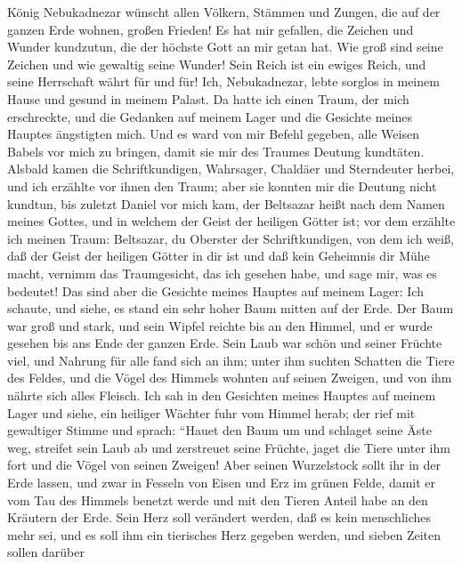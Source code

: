  König Nebukadnezar wünscht allen Völkern, Stämmen und
Zungen, die auf der ganzen Erde wohnen, großen Frieden! 
Es hat mir gefallen, die Zeichen und Wunder kundzutun, die der höchste
Gott an mir getan hat.  Wie groß sind seine Zeichen und
wie gewaltig seine Wunder! Sein Reich ist ein ewiges Reich, und seine
Herrschaft währt für und für!  Ich, Nebukadnezar, lebte
sorglos in meinem Hause und gesund in meinem Palast.  Da
hatte ich einen Traum, der mich erschreckte, und die Gedanken auf meinem
Lager und die Gesichte meines Hauptes ängstigten mich. 
Und es ward von mir Befehl gegeben, alle Weisen Babels vor mich zu
bringen, damit sie mir des Traumes Deutung kundtäten. 
Alsbald kamen die Schriftkundigen, Wahrsager, Chaldäer und Sterndeuter
herbei, und ich erzählte vor ihnen den Traum; aber sie konnten mir die
Deutung nicht kundtun,  bis zuletzt Daniel vor mich kam,
der Beltsazar heißt nach dem Namen meines Gottes, und in welchem der
Geist der heiligen Götter ist; vor dem erzählte ich meinen Traum:
 Beltsazar, du Oberster der Schriftkundigen, von dem ich
weiß, daß der Geist der heiligen Götter in dir ist und daß kein
Geheimnis dir Mühe macht, vernimm das Traumgesicht, das ich gesehen
habe, und sage mir, was es bedeutet!  Das sind aber die
Gesichte meines Hauptes auf meinem Lager: Ich schaute, und siehe, es
stand ein sehr hoher Baum mitten auf der Erde.  Der Baum
war groß und stark, und sein Wipfel reichte bis an den Himmel, und er
wurde gesehen bis ans Ende der ganzen Erde.  Sein Laub
war schön und seiner Früchte viel, und Nahrung für alle fand sich an
ihm; unter ihm suchten Schatten die Tiere des Feldes, und die Vögel des
Himmels wohnten auf seinen Zweigen, und von ihm nährte sich alles
Fleisch.  Ich sah in den Gesichten meines Hauptes auf
meinem Lager und siehe, ein heiliger Wächter fuhr vom Himmel herab;
 der rief mit gewaltiger Stimme und sprach: ``Hauet den
Baum um und schlaget seine Äste weg, streifet sein Laub ab und
zerstreuet seine Früchte, jaget die Tiere unter ihm fort und die Vögel
von seinen Zweigen!  Aber seinen Wurzelstock sollt ihr in
der Erde lassen, und zwar in Fesseln von Eisen und Erz im grünen Felde,
damit er vom Tau des Himmels benetzt werde und mit den Tieren Anteil
habe an den Kräutern der Erde.  Sein Herz soll verändert
werden, daß es kein menschliches mehr sei, und es soll ihm ein
tierisches Herz gegeben werden, und sieben Zeiten sollen darüber
